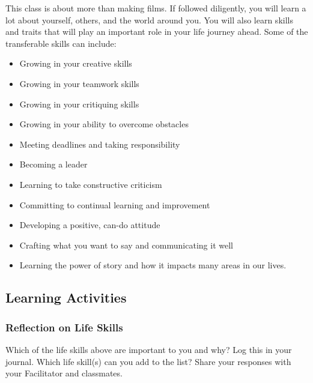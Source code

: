 \documentclass[
]{book}
\providecommand{\tightlist}{%
  \setlength{\itemsep}{0pt}\setlength{\parskip}{0pt}}
\begin{document}
This class is about more than making films. If followed diligently, you will learn a lot about yourself, others, and the world around you. You will also learn skills and traits that will play an important role in your life journey ahead. Some of the transferable skills can include:

\begin{itemize}
\tightlist
\item
  Growing in your creative skills\\
\item
  Growing in your teamwork skills\\
\item
  Growing in your critiquing skills\\
\item
  Growing in your ability to overcome obstacles\\
\item
  Meeting deadlines and taking responsibility\\
\item
  Becoming a leader\\
\item
  Learning to take constructive criticism\\
\item
  Committing to continual learning and improvement\\
\item
  Developing a positive, can-do attitude\\
\item
  Crafting what you want to say and communicating it well\\
\item
  Learning the power of story and how it impacts many areas in our lives.
\end{itemize}

\hypertarget{learning-activities-4}{%
\subsection*{Learning Activities}\label{learning-activities-4}}

\begin{reflect}
\hypertarget{reflection-on-life-skills}{%
\subsubsection*{Reflection on Life Skills}\label{reflection-on-life-skills}}

Which of the life skills above are important to you and why? Log this in your journal. Which life skill(s) can you add to the list? Share your responses with your Facilitator and classmates.
\end{reflect}
\end{document}
